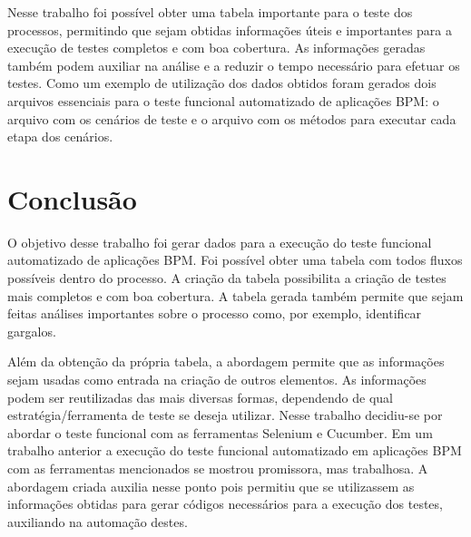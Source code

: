 \documentclass[12pt]{article}
\begin{document}
Nesse trabalho foi possível obter uma tabela importante para o teste dos processos, permitindo que sejam obtidas informações úteis e importantes para a execução de testes completos e com boa cobertura. As informações geradas também podem auxiliar na análise e a reduzir o tempo necessário para efetuar os testes. Como um exemplo de utilização dos dados obtidos foram gerados dois arquivos essenciais para o teste funcional automatizado de aplicações BPM: o arquivo com os cenários de teste e o arquivo com os métodos para executar cada etapa dos cenários. %

\section{Conclusão}

O objetivo desse trabalho foi gerar dados para a execução do teste funcional automatizado de aplicações BPM. Foi possível obter uma tabela com todos fluxos possíveis dentro do processo. A criação da tabela possibilita a criação de testes mais completos e com boa cobertura. A tabela gerada também permite que sejam feitas análises importantes sobre o processo como, por exemplo, identificar gargalos.

Além da obtenção da própria tabela, a abordagem permite que as informações sejam usadas como entrada na criação de outros elementos. As informações podem ser reutilizadas das mais diversas formas, dependendo de qual estratégia/ferramenta de teste se deseja utilizar. Nesse trabalho decidiu-se por abordar o teste funcional com as ferramentas Selenium e Cucumber. Em um trabalho anterior a execução do teste funcional automatizado em aplicações BPM com as ferramentas mencionados se mostrou promissora, mas trabalhosa. A abordagem criada auxilia nesse ponto pois permitiu que se utilizassem as informações obtidas para gerar códigos necessários para a execução dos testes, auxiliando na automação destes.
\end{document}
